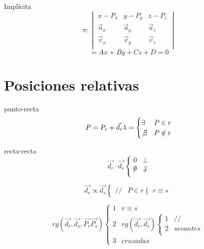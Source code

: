 \documentclass[12pt, letterpaper, twoside]{article}
\begin{document}
	
	Implícita
	\begin{equation}
		\pi :
		\begin{vmatrix}
			x - P_x   & y - P_y   & z - P_z   \\
			\vec{u}_x & \vec{u}_y & \vec{u}_z \\
			\vec{v}_x & \vec{v}_y & \vec{v}_z \\
		\end{vmatrix}
	\end{equation}
	\begin{equation}
		= Ax + By + Cz + D = 0
	\end{equation}


	\section{Posiciones relativas}
	
	punto-recta
	\begin{equation}
		P = P_r + \vec{d_r} \lambda =
		\begin{cases}
			\exists     & P \in r    \\
			\not\exists & P \not\in r \\
		\end{cases}
	\end{equation}

	recta-recta
	\begin{equation}
		\vec{d_r} \cdot \vec{d_s}
		\begin{cases}
			0     & \perp     \\
			\not0 & \not\perp \\
		\end{cases}
	\end{equation}

	\begin{equation}
		\vec{d_r} \propto \vec{d_s}
		\begin{cases}
			// & P \in r
			\begin{cases}
				r \equiv s
			\end{cases}
		\end{cases}
	\end{equation}

	\begin{equation}
		rg(\vec{d_r}, \vec{d_s}, \vec{P_r P_s})
		\begin{cases}
			1     & r \equiv s     \\
			2     & rg(\vec{d_r}, \vec{d_s})
			\begin{cases}
				1     & //       \\
				2     & secantes \\
			\end{cases} \\
			3     & cruzadas
		\end{cases}
	\end{equation}
	
\end{document}

